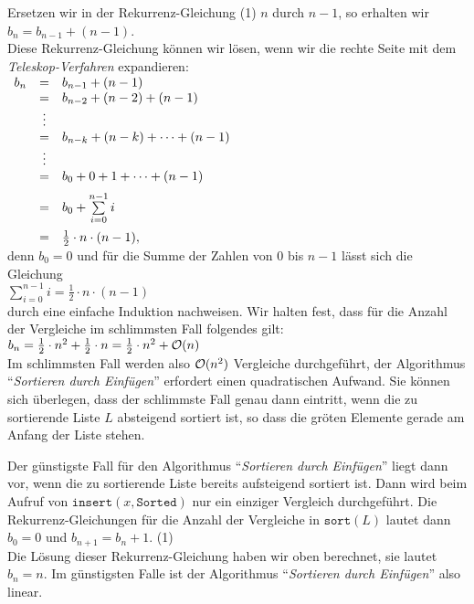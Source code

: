 Ersetzen wir in der Rekurrenz-Gleichung (1) $n$ durch $n-1$, so erhalten wir 
\\[0.2cm]
\hspace*{1.3cm}
$b_n = b_{n-1} + (n - 1)$.
\\[0.2cm]
Diese Rekurrenz-Gleichung k\"onnen wir l\"osen, wenn wir die rechte Seite mit dem
\emph{Teleskop-Verfahren} expandieren:
\\[0.2cm]
\hspace*{1.3cm}
$
\begin{array}[t]{lcl}
  b_{n} & = & b_{n-1} + (n - 1)                     \\ 
        & = & b_{n-2} + (n - 2) + (n - 1)           \\ 
        & \vdots &                                  \\
        & = & b_{n-k} + (n - k) + \cdots + (n - 1)  \\ 
        & \vdots &                                  \\
        & = & b_{0} + 0 + 1 + \cdots + (n - 1)      \\[0.2cm] 
        & = & b_{0} + \sum\limits_{i = 0}^{n - 1} i \\[0.4cm]
        & = & \frac{1}{2} \cdot n \cdot (n - 1),
\end{array}
$
\\[0.2cm]
denn $b_0 = 0$ und f\"ur die Summe der Zahlen von 0 bis $n - 1$ l\"asst sich die Gleichung
\\[0.2cm]
\hspace*{1.3cm}
$\sum\limits_{i = 0}^{n - 1} i  = \frac{1}{2} \cdot n \cdot (n - 1)$
\\[0.2cm]
durch eine einfache Induktion nachweisen.  Wir halten fest, dass f\"ur die Anzahl der
Vergleiche im schlimmsten Fall folgendes gilt:
\\[0.2cm]
\hspace*{1.3cm}
$b_n = \frac{1}{2} \cdot n^2 + \frac{1}{2} \cdot n = \frac{1}{2} \cdot n^2 + \mathcal{O}(n)$
\\[0.2cm]
Im schlimmsten Fall werden also $\mathcal{O}(n^2)$ Vergleiche durchgef\"uhrt, der Algorithmus 
``\emph{Sortieren durch Einf\"ugen}'' erfordert einen quadratischen Aufwand.
Sie k\"onnen sich \"uberlegen, dass der schlimmste Fall genau dann eintritt, wenn die zu
sortierende Liste $L$ absteigend sortiert ist, so dass die gr\"o\3ten Elemente gerade am
Anfang der Liste stehen.

Der g\"unstigste Fall f\"ur den Algorithmus ``\emph{Sortieren durch Einf\"ugen}'' liegt dann
vor, wenn die zu sortierende Liste bereits aufsteigend sortiert ist.  Dann wird beim
Aufruf von $\mathtt{insert}(x,\mathtt{Sorted})$ nur ein einziger Vergleich durchgef\"uhrt.
Die Rekurrenz-Gleichungen f\"ur die Anzahl der Vergleiche in $\mathtt{sort}(L)$ lautet dann \\[0.2cm]
\hspace*{1.3cm} $b_0 = 0$ \quad und \quad $b_{n+1} = b_n + 1$. \hspace*{\fill} (1)\\[0.2cm]
Die L\"osung dieser Rekurrenz-Gleichung haben wir oben berechnet, sie lautet $b_n = n$.
Im g\"unstigsten Falle ist der Algorithmus ``\emph{Sortieren durch Einf\"ugen}'' also linear.

